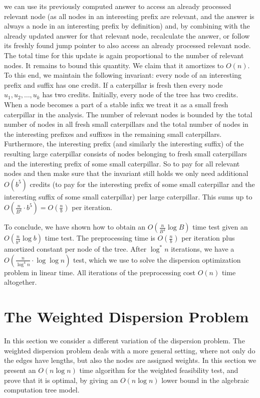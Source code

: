\documentclass[11pt,a4paper]{article}
\theoremstyle{definition}
\theoremstyle{remark}
\begin{document}
we can use its previously computed answer to access an already processed relevant node
(as all nodes in an interesting prefix are relevant, and the answer is always a node in an
interesting prefix by definition) and, by combining with the already updated answer for that
relevant node, recalculate the answer, or follow its freshly found jump pointer to also access
an already processed relevant node. The total time for this update is again proportional to the
number of relevant nodes. It remains to bound this quantity. We claim that it
amortizes to $O(n)$. To this end, we maintain the following invariant: every node
of an interesting prefix and suffix has one credit. If a caterpillar is fresh
then every node $u_{1},u_{2},\ldots,u_{k}$ has two credits. Initially, every node of the tree
has two credits. When a node becomes a part of a stable infix we treat it as a small fresh
caterpillar in the analysis. The number of relevant nodes is bounded by the total number
of nodes in all fresh small caterpillars and the total number of nodes in the interesting
prefixes and suffixes in the remaining small caterpillars. Furthermore,
the interesting prefix (and similarly the interesting suffix) of the resulting large caterpillar
consists of nodes belonging to fresh small caterpillars and the interesting prefix of
some small caterpillar. So to pay for all relevant nodes and then make sure that the invariant
still holds we only need additional $O(b^{5})$ credits (to pay for the interesting prefix
of some small caterpillar and the interesting suffix of some small caterpillar) per large
caterpillar. This sums up to $O(\frac{n}{B^{4}}\cdot b^{5}) = O(\frac{n}{b})$ per iteration.

To conclude, we have shown how to obtain an $O(\frac{n}{B^{4}}\log B)$ time test given an $O(\frac{n}{b^{4}}\log b)$
time test. The preprocessing time is $O(\frac{n}{b})$ per iteration plus amortized constant per
node of the tree. After $\log ^*n$ iterations, we have a $O(\frac{n}{\log ^4n} \cdot \log \log n)$ test,
which we use to solve the dispersion optimization problem in linear time. All iterations of the preprocessing
cost $O(n)$ time altogether.


\section{The Weighted Dispersion Problem}
In this section we consider a different variation of the dispersion problem.
The weighted dispersion problem deals with a more general setting, where not only do the edges have lengths, but also the nodes are assigned weights. In this section we present an $O(n\log n)$ time algorithm for the weighted feasibility test, and prove that it is optimal, by giving an $O(n\log n)$ lower bound in the algebraic computation tree model.
\end{document}
